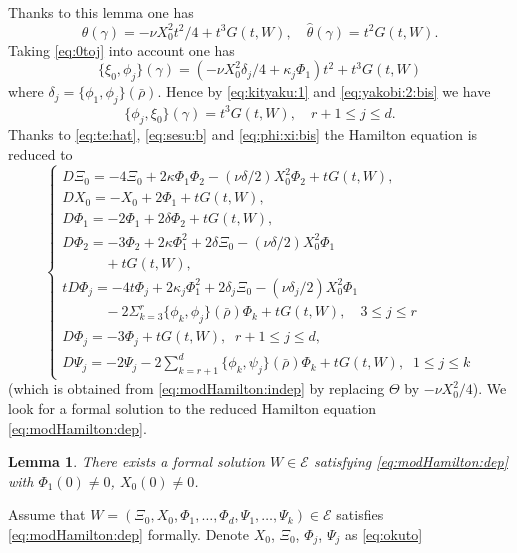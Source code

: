 \documentclass[12pt,leqno]{article} %
\def\ga{\gamma}
\def\bro{\bar\rho}
\def\bro{\bar\rho}
\numberwithin{equation}{section}
\newtheorem{lem}{Lemma}[section]
\begin{document}
%
Thanks to this lemma one has
%
\begin{equation}
\label{eq:te:hat}
\hat \theta(\ga)=-\nu X_0^2t^2/4+t^3G(t,W),\quad \hat\theta(\ga)=t^2G(t,W).
\end{equation}
%
Taking \eqref{eq:0toj} into account one has
%
\begin{equation}
\label{eq:sesu:b}
\{\xi_0,\phi_j\}(\ga)=(-\nu X_0^2\delta_j/4+\kappa_j\Phi_1)t^2+t^3G(t, W)
\end{equation}
%
where $\delta_j=\{\phi_1,\phi_j\}(\bro)$. Hence by \eqref{eq:kityaku:1} and \eqref{eq:yakobi:2:bis} we have
%
\begin{equation}
\label{eq:phi:xi:bis}
\{\phi_j,\xi_0\}(\ga)=t^3G(t, W),\quad r+1\leq j\leq d.
\end{equation}
%
Thanks to \eqref{eq:te:hat}, \eqref{eq:sesu:b} and \eqref{eq:phi:xi:bis}  the Hamilton equation is reduced to
%
\begin{equation}
\label{eq:modHamilton:dep}
\left\{\begin{array}{llllll}
D\Xi_0=-4\Xi_0+2\kappa\Phi_1\Phi_2-(\nu\delta/2) X^2_0\Phi_2+ tG(t,W),\\[3pt]
DX_0=-X_0+2\Phi_1+tG(t, W),\\[3pt]
D\Phi_1=-2\Phi_1+2\delta \Phi_2+tG(t, W),\\[3pt]
D\Phi_2=-3\Phi_2+2\kappa\Phi_1^2+2\delta \Xi_0-(\nu\delta/2) X_0^2 \Phi_1\\[3pt]
\quad\quad \quad+tG(t, W),\\[3pt]
tD\Phi_j=-4t\Phi_j+2\kappa_j\Phi_1^2+2\delta_j\Xi_0-(\nu\delta_j/2)X_0^2\Phi_1\\[3pt]
\quad\quad \quad -2\Sigma_{k=3}^r\{\phi_k,\phi_j\}(\bro)\Phi_k+tG(t, W),\quad 3\leq j\leq r\\[3pt]
D\Phi_j=-3\Phi_j+tG(t, W),\;\;r+1\leq j\leq d,\\[3pt]
D\Psi_j=-2\Psi_j-2\sum_{k=r+1}^d\{\phi_k,\psi_j\}({\bar\rho})\Phi_k+tG(t, W),\;\;1\leq j\leq k
\end{array}\right.
\end{equation}
%
(which is obtained from \eqref{eq:modHamilton:indep} by replacing $\Theta$ by $-\nu X_0^2/4$). We look for a formal solution to the reduced Hamilton equation \eqref{eq:modHamilton:dep}.
%
\begin{lem}
\label{lem:formal-1}
There exists a formal solution $W\in {\mathcal E}$ satisfying \eqref{eq:modHamilton:dep} with $\Phi_1(0)\neq 0$, $X_0(0)\neq 0$.
%
\end{lem}
%
Assume that $W=(\Xi_0,X_0,\Phi_1,\ldots,\Phi_d,\Psi_1,\ldots,\Psi_k)\in {\mathcal E}$ satisfies \eqref{eq:modHamilton:dep} formally. Denote $X_0$, $\Xi_0$, $\Phi_j$, $\Psi_j$ as \eqref{eq:okuto}
\end{document}
